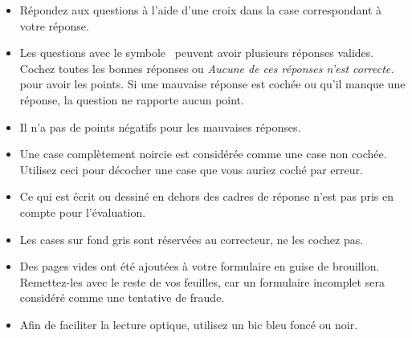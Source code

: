 \documentclass[11pt,french,a4paper]{article}
\begin{document}
{  \noindent\hrulefill{}
  \begin{itemize}[nosep]
    \item Répondez aux questions à l'aide d'une croix dans la case correspondant à votre réponse.
    \item Les questions avec le symbole~\multiSymbole{} peuvent avoir plusieurs réponses valides.
          Cochez toutes les bonnes réponses ou \textit{Aucune de ces réponses n'est correcte.} pour avoir les points.
          Si une mauvaise réponse est cochée ou qu'il manque une réponse, la question ne rapporte aucun point.
    \item Il n'a pas de points négatifs pour les mauvaises réponses.
    \item Une case complètement noircie est considérée comme une case non cochée.
          Utilisez ceci pour décocher une case que vous auriez coché par erreur.
    \item Ce qui est écrit ou dessiné en dehors des cadres de réponse n'est pas pris en compte pour l'évaluation.
    \item Les cases sur fond gris sont réservées au correcteur, ne les cochez pas.
    \item Des pages vides ont été ajoutées à votre formulaire en guise de brouillon.
          Remettez-les avec le reste de vos feuilles, car un formulaire incomplet sera considéré comme une tentative de fraude.
    \item Afin de faciliter la lecture optique, utilisez un bic bleu foncé ou noir.
  \end{itemize}
  \noindent\hrulefill{}
  \vspace*{1.5em}





}
\end{document}

